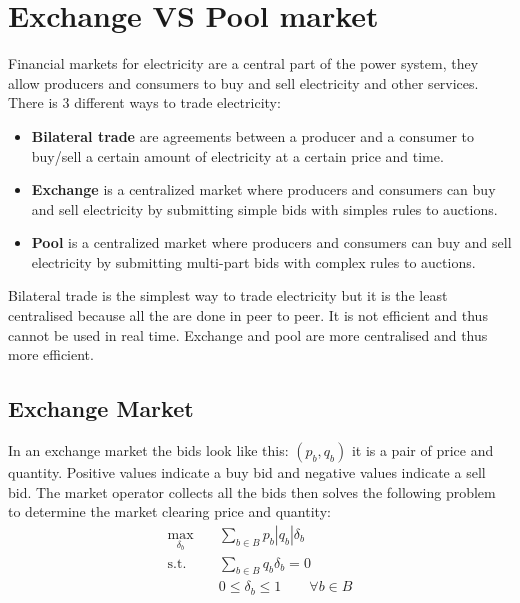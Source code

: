 \documentclass[12pt, openany]{report}
\theoremstyle{definition}
\begin{document}
\section{Exchange VS Pool market}
Financial markets for electricity are a central part of the power system, they allow producers and consumers to buy and sell electricity and other services. There is 3 different ways to trade electricity:
\begin{itemize}
    \item \textbf{Bilateral trade} are agreements between a producer and a consumer to buy/sell a certain amount of electricity at a certain price and time.
    \item \textbf{Exchange} is a centralized market where producers and consumers can buy and sell electricity by submitting simple bids with simples rules to auctions.
    \item \textbf{Pool} is a centralized market where producers and consumers can buy and sell electricity by submitting multi-part bids with complex rules to auctions.
\end{itemize}
Bilateral trade is the simplest way to trade electricity but it is the least centralised because all the are done in peer to peer. It is not efficient and thus cannot be used in real time. Exchange and pool are more centralised and thus more efficient.
\subsection{Exchange Market}
In an exchange market the bids look like this: $(p_b,q_b)$ it is a pair of price and quantity. Positive values indicate a buy bid and negative values indicate a sell bid. The market operator collects all the bids then solves the following problem to determine the market clearing price and quantity:
\begin{equation}
    \begin{aligned}
        \max_{\delta_b} \quad & \sum_{b \in B} p_b |q_b| \delta_b \\
        \text{s.t.} \quad & \sum_{b \in B} q_b \delta_b = 0 \\
        & 0 \leq \delta_b \leq 1 \qquad \forall b \in B \\
    \end{aligned}
\end{equation}
\end{document}
